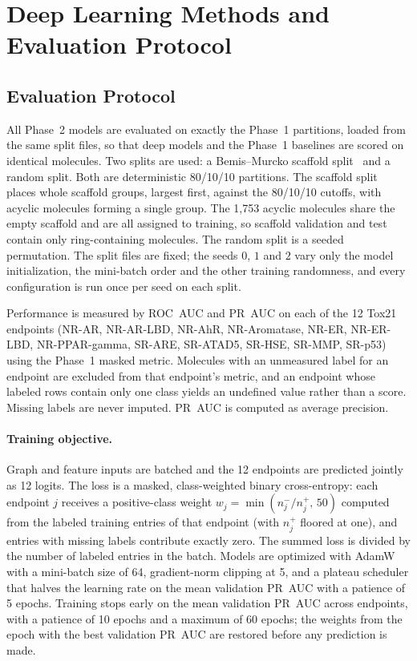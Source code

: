 \section{Deep Learning Methods and Evaluation Protocol}
\label{sec:methods_dl}

\subsection{Evaluation Protocol}
All Phase~2 models are evaluated on exactly the Phase~1 partitions, loaded from the same split files, so that deep models and the Phase~1 baselines are scored on identical molecules. Two splits are used: a Bemis--Murcko scaffold split~\cite{bemis1996properties} and a random split. Both are deterministic 80/10/10 partitions. The scaffold split places whole scaffold groups, largest first, against the 80/10/10 cutoffs, with acyclic molecules forming a single group. The 1,753 acyclic molecules share the empty scaffold and are all assigned to training, so scaffold validation and test contain only ring-containing molecules. The random split is a seeded permutation. The split files are fixed; the seeds $0$, $1$ and $2$ vary only the model initialization, the mini-batch order and the other training randomness, and every configuration is run once per seed on each split.

Performance is measured by ROC~AUC and PR~AUC on each of the 12 Tox21 endpoints (NR-AR, NR-AR-LBD, NR-AhR, NR-Aromatase, NR-ER, NR-ER-LBD, NR-PPAR-gamma, SR-ARE, SR-ATAD5, SR-HSE, SR-MMP, SR-p53) using the Phase~1 masked metric. Molecules with an unmeasured label for an endpoint are excluded from that endpoint's metric, and an endpoint whose labeled rows contain only one class yields an undefined value rather than a score. Missing labels are never imputed. PR~AUC is computed as average precision.

\paragraph{Training objective.}
Graph and feature inputs are batched and the 12 endpoints are predicted jointly as 12 logits. The loss is a masked, class-weighted binary cross-entropy: each endpoint $j$ receives a positive-class weight $w_j = \min(n^{-}_j / n^{+}_j,\, 50)$ computed from the labeled training entries of that endpoint (with $n^{+}_j$ floored at one), and entries with missing labels contribute exactly zero. The summed loss is divided by the number of labeled entries in the batch. Models are optimized with AdamW~\cite{loshchilov2019adamw} with a mini-batch size of 64, gradient-norm clipping at 5, and a plateau scheduler that halves the learning rate on the mean validation PR~AUC with a patience of 5 epochs. Training stops early on the mean validation PR~AUC across endpoints, with a patience of 10 epochs and a maximum of 60 epochs; the weights from the epoch with the best validation PR~AUC are restored before any prediction is made.

